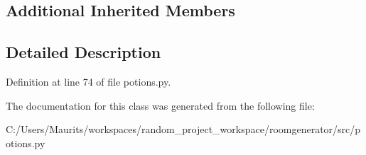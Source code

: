 \subsection*{Additional Inherited Members}


\subsection{Detailed Description}


Definition at line 74 of file potions.\+py.



The documentation for this class was generated from the following file\+:\begin{DoxyCompactItemize}
\item 
C\+:/\+Users/\+Maurits/workspaces/random\+\_\+project\+\_\+workspace/roomgenerator/src/potions.\+py\end{DoxyCompactItemize}
